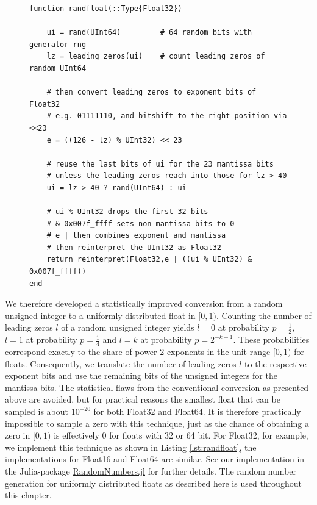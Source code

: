 \begin{figure}[tbhp]
\begin{lstlisting}[language=JuliaLocal,label=lst:randfloat,caption={\textbf{An improved random number generator for uniformly
distributed floats.} The Julia function \texttt{randfloat} takes a number format as argument (here only the version for Float32 is presented).
\texttt{\%} is the remainder after division, for unsigned integers effectively converting between unsigned integers by adding leading
zeros or discarding leading bits. \texttt{?} indicates a one-line if-clause. \texttt{\&} is the bitwise logical and-operation. \texttt{$\vert$}
is the bitwise logical or-operation.}]
function randfloat(::Type{Float32})

    ui = rand(UInt64)         # 64 random bits with generator rng
    lz = leading_zeros(ui)    # count leading zeros of random UInt64

    # then convert leading zeros to exponent bits of Float32
    # e.g. 01111110, and bitshift to the right position via <<23
    e = ((126 - lz) % UInt32) << 23

    # reuse the last bits of ui for the 23 mantissa bits
    # unless the leading zeros reach into those for lz > 40
    ui = lz > 40 ? rand(UInt64) : ui

    # ui % UInt32 drops the first 32 bits
    # & 0x007f_ffff sets non-mantissa bits to 0
    # e | then combines exponent and mantissa
    # then reinterpret the UInt32 as Float32
    return reinterpret(Float32,e | ((ui % UInt32) & 0x007f_ffff))
end
\end{lstlisting}
\end{figure}

We therefore developed a statistically improved conversion from a random unsigned integer to a uniformly distributed
float in $[0,1)$. Counting the number of leading zeros $l$ of a random unsigned integer yields $l = 0$ at probability
$p = \tfrac{1}{2}$, $l=1$ at probability $p=\tfrac{1}{4}$ and $l = k$ at probability $p=2^{-k-1}$. These probabilities
correspond exactly to the share of power-2 exponents in the unit range $[0,1)$ for floats.
Consequently, we translate the number of leading zeros $l$  to the respective exponent bits and use the remaining
bits of the unsigned integers for the mantissa bits. The statistical flaws from the conventional conversion as presented
above are avoided, but for practical reasons the smallest float that can be sampled is about $10^{-20}$ for both Float32
and Float64. It is therefore practically impossible to sample a zero with this technique, just as the chance of obtaining a
zero in $[0,1)$ is effectively 0 for floats with 32 or 64 bit. For Float32, for example, we implement this technique as shown
in Listing \ref{lst:randfloat}, the implementations for Float16 and Float64 are similar. See our implementation in the Julia-package
\href{https://github.com/JuliaRandom/RandomNumbers.jl}{RandomNumbers.jl} for further details. The random number generation
for uniformly distributed floats as described here is used throughout this chapter.

